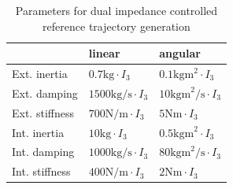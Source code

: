 \documentclass[a4paper,twoside, openright,12pt]{report}
\begin{document}
\begin{table}[b]
	\centering
	\caption[Parameters for dual impedance controlled reference trajectory generation]{Parameters for dual impedance controlled reference trajectory generation}\vspace{10pt}
	\label{TAB:CaViParameters}
	
	\begin{tabular}{ l | l | l }
	 & linear & angular \\ \hline
	Ext. inertia & $0.7 \text{kg} \cdot I_3$ & $0.1 \text{kgm}^2 \cdot I_3$ \\ \hline
	Ext. damping	 & $1500 \text{kg/s} \cdot I_3$ & $10 \text{kgm}^2 \text{/s} \cdot I_3$ \\ \hline
	Ext. stiffness & $700 \text{N/m} \cdot I_3$ & $5 \text{Nm} \cdot  I_3$ \\ \hline
	Int. inertia & $10 \text{kg} \cdot I_3$ & $0.5 \text{kgm}^2 \cdot I_3$ \\ \hline
	Int. damping & $1000 \text{kg/s} \cdot I_3$ & $80 \text{kgm}^2 \text{/s} \cdot I_3 $ \\ \hline
	Int. stiffness & $400 \text{N/m} \cdot I_3$ & $2 \text{Nm} \cdot I_3$\\ \hline
\end{tabular}
\end{table}
\end{document}

